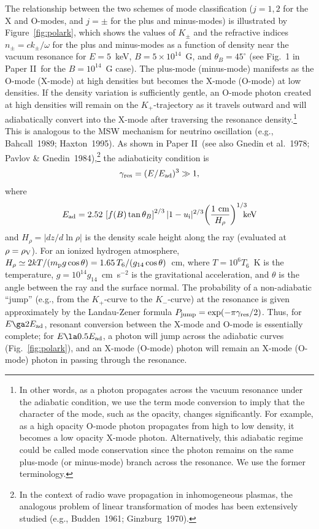 \documentclass{mn2e}
\newcommand{\be}{\begin{equation}}
\newcommand{\ee}{\end{equation}}
\newcommand{\lp}{\left(}
\newcommand{\rp}{\right)}
\newcommand{\lb}{\left[}
\newcommand{\rb}{\right]}
\newcommand{\etal}{et al.}
\newcommand{\mpr}{m_{\rm p}}
\newcommand{\thetab}{\theta_B}
\newcommand{\uion}{u_{\rm i}}
\newcommand{\densvp}{\rho_{\rm V}}
\newcommand{\laiho}{Paper II}
\begin{document}
{The relationship between the two schemes of mode classification
($j=1,2$ for the X and O-modes, and $j=\pm$ for the plus and minus-modes)
is illustrated by Figure~\ref{fig:polark}, which shows the values
of $K_\pm$ and the refractive indices $n_\pm=ck_\pm/\omega$ for
the plus and minus-modes as a function of density near the vacuum
resonance for $E=5$~keV, $B=5\times 10^{14}$~G, and $\thetab=45^\circ$
(see Fig.~1 in \laiho\ for the $B=10^{14}$~G case).
The plus-mode (minus-mode) manifests as the O-mode
(X-mode) at high densities but becomes the X-mode (O-mode) at low densities.
If the density variation is sufficiently gentle, an O-mode photon
created at high densities will remain on the $K_+$-trajectory
as it travels outward and will adiabatically
convert into the X-mode after traversing the resonance
density.\footnote{In other words, as a photon propagates across the vacuum
resonance under the adiabatic condition, we use the term mode conversion
to imply that the character of the mode, such as the opacity, changes
significantly.  For example, as a high opacity O-mode photon propagates
from high to low density, it becomes a low opacity X-mode photon.
Alternatively, this adiabatic regime could be called mode conservation
since the photon remains on the same plus-mode (or minus-mode) branch
across the resonance.  We use the former terminology.}
This is analogous to the MSW mechanism for neutrino oscillation
(e.g., Bahcall~1989; Haxton~1995).  As shown in \laiho\
(see also Gnedin \etal~1978; Pavlov \& Gnedin~1984),\footnote{
In the context of radio wave propagation in inhomogeneous plasmas,
the analogous problem of linear transformation of modes has been
extensively studied (e.g., Budden~1961; Ginzburg~1970).}
the adiabaticity condition is
\be
\gamma_{\rm res} = (E/E_{\rm ad})^3 \gg 1, \label{eq:adiabat}
\ee
where
\be
E_{\rm ad} = 2.52\,\lb f(B)\tan\thetab\rb^{2/3}|1-\uion|^{2/3}
\! \lp\frac{1\mbox{ cm}}{H_\rho}\rp^{1/3} \!\!\!\! \mbox{keV}
\label{eq:enadiabat}
\ee
and $H_\rho=|dz/d\ln\rho|$ is the density scale height along the ray
(evaluated at $\rho=\densvp$).
For an ionized hydrogen atmosphere,
$H_\rho\simeq 2kT/(\mpr g\cos\theta)=1.65\,T_6/(g_{14}\cos\theta)$~cm,
where $T=10^6T_6$~K is the temperature, $g=10^{14}g_{14}$~cm~s$^{-2}$
is the gravitational acceleration, and $\theta$ is the angle between
the ray and the surface normal.  The probability of a non-adiabatic
``jump'' (e.g., from the $K_+$-curve to the $K_-$-curve) at the
resonance is given approximately by the Landau-Zener formula
$P_{\rm jump}=\exp(-\pi\gamma_{\rm res}/2)$.
Thus, for $E\ga 2E_{\rm ad}$, resonant
conversion between the X-mode and O-mode is essentially complete;
for $E\la 0.5E_{\rm ad}$, a photon will jump across the adiabatic
curves (Fig.~\ref{fig:polark}), and an X-mode (O-mode) photon will
remain an X-mode (O-mode) photon in passing through the resonance.

}
\end{document}
